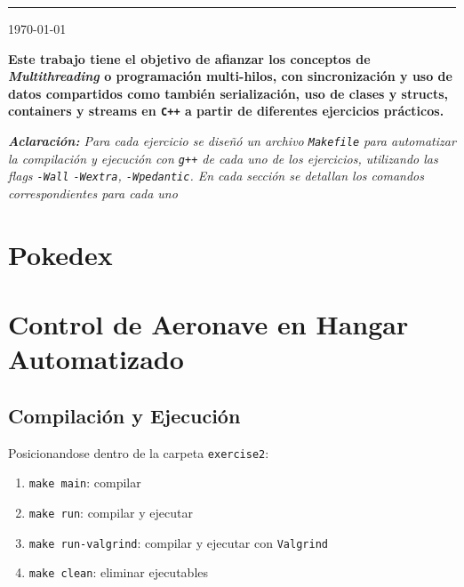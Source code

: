 \documentclass[11pt, a4paper]{article}
\begin{document}
{\noindent\rule{\textwidth}{0.5pt}}


\begin{center}
    {\large \today}
\end{center}

\begin{multicols}{2}

{\bfseries\selectfont Este trabajo tiene el objetivo de afianzar los conceptos de
\textit{Multithreading} o programación multi-hilos, con sincronización y uso de datos
compartidos como también serialización, uso de clases y structs, containers y streams
en \lstinline|C++| a partir de diferentes ejercicios prácticos.
}
\begin{center}
    {\small\itshape\textbf{Aclaración:} Para cada ejercicio se diseñó un archivo \lstinline|Makefile|
    para automatizar la compilación y ejecución con \lstinline|g++| de cada uno de los ejercicios, 
    utilizando las flags \lstinline|-Wall| \lstinline|-Wextra|, \lstinline|-Wpedantic|. En cada sección se detallan
    los comandos correspondientes para cada uno} 
\end{center}

\section{Pokedex}


\section{Control de Aeronave en Hangar Automatizado}



\subsection{Compilación y Ejecución}

Posicionandose dentro de la carpeta \lstinline|exercise2|:

\begin{enumerate}[label=\roman*.]
    \item \lstinline|make main|: compilar
    \item \lstinline|make run|: compilar y ejecutar
    \item \lstinline|make run-valgrind|: compilar y ejecutar con \lstinline|Valgrind|
    \item \lstinline|make clean|: eliminar ejecutables
\end{enumerate}



\end{multicols}
\end{document}
